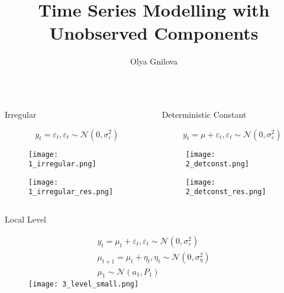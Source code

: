 \documentclass{beamer}
\author[]{Olya Gnilova}
\title{Time Series Modelling with Unobserved Components}
\institute{Higher School of Economics, 2017}
\begin{document}
\begin{frame}[fragile]\centering

\begin{columns}[T]
\begin{column}{.32\textwidth}

\begin{columns}[T]
\begin{column}{.49\textwidth}

\begin{block}{Irregular}



\[
y_t = \varepsilon_t, \varepsilon_t \sim \mathcal{N}(0, \sigma^2_\varepsilon)
\]

\begin{figure}[htb]
  \texttt{[image: 1\_irregular.png]}
\end{figure}
\begin{figure}[htb]
  \texttt{[image: 1\_irregular\_res.png]}
\end{figure}
\end{block}
\end{column}

\begin{column}{.49\textwidth}

\begin{block}{Deterministic Constant}


\[
y_{t} = \mu + \varepsilon_{t}, \varepsilon_{t} \sim \mathcal{N}(0, \sigma^{2}_{\varepsilon})
\]

\begin{figure}[htb]
  \texttt{[image: 2\_detconst.png]}
\end{figure}
\begin{figure}[htb]
  \texttt{[image: 2\_detconst\_res.png]}
\end{figure}
\end{block}
\end{column}
\end{columns}

\begin{block}{Local Level}

\vspace{-0.25cm}

\begin{figure}[htb]
\begin{gather*}
y_{t} = \mu_{t} + \varepsilon_{t}, \varepsilon_{t} \sim \mathcal{N}(0, \sigma^2_\varepsilon) 
\\
\mu_{t+1} = \mu_{t} + \eta_{t}, \eta_{t} \sim \mathcal{N}(0, \sigma_{\eta}^{2}) 
\\
\mu_1 \sim \mathcal{N}(a_{1}, P_{1})
\end{gather*}
\endminipage \hfill
{}
\texttt{[image: 3\_level\_small.png]}
\endminipage\hfill
\end{figure}


\end{block}
\end{column}
\end{columns}
\end{frame}
\end{document}

